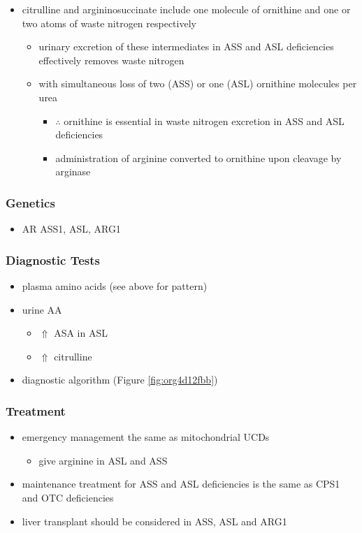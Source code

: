 \documentclass[12pt]{scrartcl}
\begin{document}
\begin{center}
\begin{center}
\begin{itemize}
\item citrulline and argininosuccinate include one molecule of ornithine
and one or two atoms of waste nitrogen respectively
\begin{itemize}
\item urinary excretion of these intermediates in ASS and ASL
deficiencies effectively removes waste nitrogen
\item with simultaneous loss of two (ASS) or one (ASL) ornithine
molecules per urea
\begin{itemize}
\item \(\therefore\) ornithine is essential in waste nitrogen excretion in
ASS and ASL deficiencies
\item administration of arginine converted to ornithine upon cleavage by arginase
\end{itemize}
\end{itemize}
\end{itemize}

\subsubsection{Genetics}
\label{sec:org2b5b22f}
\begin{itemize}
\item AR ASS1, ASL, ARG1
\end{itemize}

\subsubsection{Diagnostic Tests}
\label{sec:orgf187ae2}
\begin{itemize}
\item plasma amino acids (see above for pattern)
\item urine AA
\begin{itemize}
\item \(\Uparrow\) ASA in ASL
\item \(\Uparrow\) citrulline
\end{itemize}
\item diagnostic algorithm (Figure \ref{fig:org4d12fbb})
\end{itemize}

\subsubsection{Treatment}
\label{sec:org1d4f00d}
\begin{itemize}
\item emergency management the same as mitochondrial UCDs
\begin{itemize}
\item give arginine in ASL and ASS
\end{itemize}
\item maintenance treatment for ASS and ASL deficiencies is the same as
CPS1 and OTC deficiencies
\item liver transplant should be considered in ASS, ASL and ARG1
\end{itemize}


\end{center}
\end{center}
\end{document}
